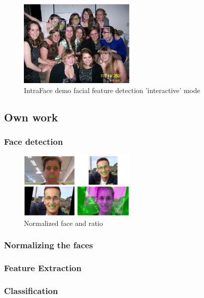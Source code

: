 \documentclass[10pt,a4paper,twocolumn]{article}
\begin{document}
\begin{figure}[!h]
	\begin{center}
	\includegraphics[width=0.5\textwidth]{interactive.jpg}
	\caption{IntraFace demo facial feature detection 'interactive' mode}
	\label{fig:int}
	\end{center}
\end{figure}


\subsection{Own work}

\subsubsection{Face detection}
\begin{figure}[!h]
	\begin{center}
	\includegraphics[width=0.5\textwidth]{ratio.png}
	\caption{Normalized face and ratio}
	\label{fig:ratio}
	\end{center}
\end{figure}

\subsubsection{Normalizing the faces}


\subsubsection{Feature Extraction}


\subsubsection{Classification}
\end{document}
